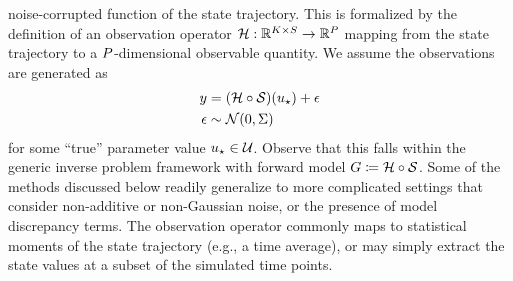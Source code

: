 \documentclass[12pt]{article}
\begin{document}
noise-corrupted function of the state trajectory. This is formalized by the definition of an observation operator 
$\mathcal{H}: \mathbb{R}^{K \times S} \to \mathbb{R}^{P}$ mapping from the state trajectory to a 
$P$-dimensional observable quantity. We assume the observations are generated as 
\begin{align}
y &= (\mathcal{H} \circ \mathcal{S})(u_{\star}) + \epsilon \\
\epsilon &\sim \mathcal{N}(0, \Sigma) \nonumber 
\end{align}
for some ``true'' parameter value $u_{\star} \in \mathcal{U}$. Observe that this falls within the generic 
inverse problem framework with forward model $G \coloneqq \mathcal{H} \circ \mathcal{S}$. 
Some of the methods discussed below readily 
generalize to more complicated settings that consider non-additive or non-Gaussian noise, or the presence of 
model discrepancy terms. The observation operator commonly maps to statistical moments of the state 
trajectory (e.g., a time average), or may simply extract the state values at a subset of the simulated time 
points.
\end{document}
